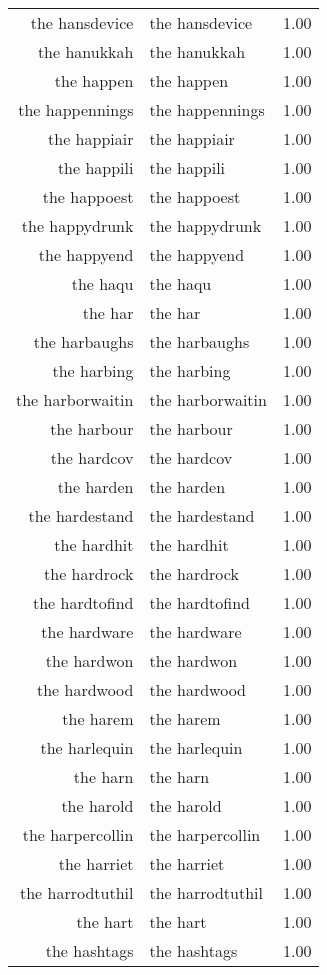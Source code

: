 \begin{table}[ht]
\begin{tabular}{rlr}
  the hansdevice & the hansdevice & 1.00 \\ 
  the hanukkah & the hanukkah & 1.00 \\ 
  the happen & the happen & 1.00 \\ 
  the happennings & the happennings & 1.00 \\ 
  the happiair & the happiair & 1.00 \\ 
  the happili & the happili & 1.00 \\ 
  the happoest & the happoest & 1.00 \\ 
  the happydrunk & the happydrunk & 1.00 \\ 
  the happyend & the happyend & 1.00 \\ 
  the haqu & the haqu & 1.00 \\ 
  the har & the har & 1.00 \\ 
  the harbaughs & the harbaughs & 1.00 \\ 
  the harbing & the harbing & 1.00 \\ 
  the harborwaitin & the harborwaitin & 1.00 \\ 
  the harbour & the harbour & 1.00 \\ 
  the hardcov & the hardcov & 1.00 \\ 
  the harden & the harden & 1.00 \\ 
  the hardestand & the hardestand & 1.00 \\ 
  the hardhit & the hardhit & 1.00 \\ 
  the hardrock & the hardrock & 1.00 \\ 
  the hardtofind & the hardtofind & 1.00 \\ 
  the hardware & the hardware & 1.00 \\ 
  the hardwon & the hardwon & 1.00 \\ 
  the hardwood & the hardwood & 1.00 \\ 
  the harem & the harem & 1.00 \\ 
  the harlequin & the harlequin & 1.00 \\ 
  the harn & the harn & 1.00 \\ 
  the harold & the harold & 1.00 \\ 
  the harpercollin & the harpercollin & 1.00 \\ 
  the harriet & the harriet & 1.00 \\ 
  the harrodtuthil & the harrodtuthil & 1.00 \\ 
  the hart & the hart & 1.00 \\ 
  the hashtags & the hashtags & 1.00 \\ 

\end{tabular}
\end{table}
